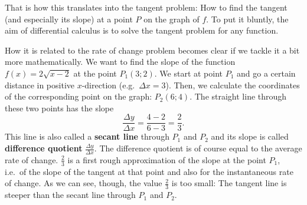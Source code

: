 \documentclass[12pt,eng]{skript_ogg}
\begin{document}
That is how this translates into the tangent problem: How to find the tangent (and especially its slope) at a point $P$ on the graph of $f$. To put it bluntly, the aim of differential calculus is to solve the tangent problem for any function.

How it is related to the rate of change problem becomes clear if we tackle it a bit more mathematically. We want to find the slope of the function $f(x)=2\sqrt{x-2}$ at the point $P_1(3;2)$. We start at point $P_1$ and go a certain distance in positive $x$-direction (e.g.\ $\Delta x=3$). Then, we calculate the coordinates of the corresponding point on the graph: $P_2(6;4)$. The straight line through these two points has the slope 
\[\frac{\Delta y}{\Delta x}=\frac{4-2}{6-3}=\frac{2}{3}.\]
This line is also called a \textbf{secant line} through $P_1$ and $P_2$ and its slope is called \textbf{difference quotient} $\frac{\Delta y}{\Delta x}$. The difference quotient is of course equal to the average rate of change. $\frac{2}{3}$ is a first rough approximation of the slope at the point $P_1$, i.e.\ of the slope of the tangent at that point and also for the instantaneous rate of change. As we can see, though, the value $\frac{2}{3}$ is too small: The tangent line is steeper than the secant line through $P_1$ and $P_2$. 
\end{document}
